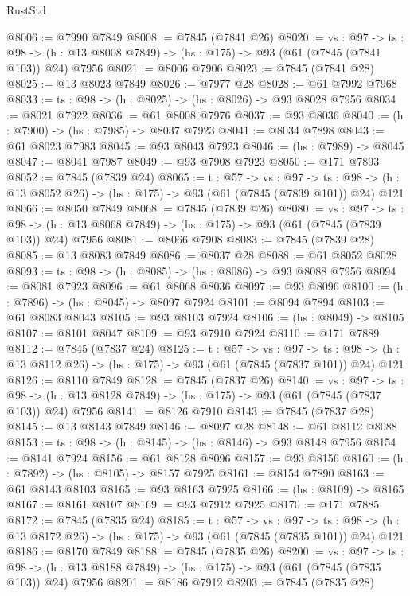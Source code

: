 \begin{lexlean}{RustStd}
\begin{coremodule}
@8006 := @7990 @7849
@8008 := @7845 (@7841 @26)
@8020 := {vs : @97} ->
  {ts : @98} -> (h : @13 @8008 @7849) -> (hs : @175) -> @93 (@61 (@7845 (@7841 @103)) @24) @7956
@8021 := @8006 @7906
@8023 := @7845 (@7841 @28)
@8025 := @13 @8023 @7849
@8026 := @7977 @28
@8028 := @61 @7992 @7968
@8033 := {ts : @98} -> (h : @8025) -> (hs : @8026) -> @93 @8028 @7956
@8034 := @8021 @7922
@8036 := @61 @8008 @7976
@8037 := @93 @8036
@8040 := (h : @7900) -> (hs : @7985) -> @8037 @7923
@8041 := @8034 @7898
@8043 := @61 @8023 @7983
@8045 := @93 @8043 @7923
@8046 := (hs : @7989) -> @8045
@8047 := @8041 @7987
@8049 := @93 @7908 @7923
@8050 := @171 @7893
@8052 := @7845 (@7839 @24)
@8065 := {t : @57} ->
  {vs : @97} ->
  {ts : @98} -> (h : @13 @8052 @26) -> (hs : @175) -> @93 (@61 (@7845 (@7839 @101)) @24) @121
@8066 := @8050 @7849
@8068 := @7845 (@7839 @26)
@8080 := {vs : @97} ->
  {ts : @98} -> (h : @13 @8068 @7849) -> (hs : @175) -> @93 (@61 (@7845 (@7839 @103)) @24) @7956
@8081 := @8066 @7908
@8083 := @7845 (@7839 @28)
@8085 := @13 @8083 @7849
@8086 := @8037 @28
@8088 := @61 @8052 @8028
@8093 := {ts : @98} -> (h : @8085) -> (hs : @8086) -> @93 @8088 @7956
@8094 := @8081 @7923
@8096 := @61 @8068 @8036
@8097 := @93 @8096
@8100 := (h : @7896) -> (hs : @8045) -> @8097 @7924
@8101 := @8094 @7894
@8103 := @61 @8083 @8043
@8105 := @93 @8103 @7924
@8106 := (hs : @8049) -> @8105
@8107 := @8101 @8047
@8109 := @93 @7910 @7924
@8110 := @171 @7889
@8112 := @7845 (@7837 @24)
@8125 := {t : @57} ->
  {vs : @97} ->
  {ts : @98} -> (h : @13 @8112 @26) -> (hs : @175) -> @93 (@61 (@7845 (@7837 @101)) @24) @121
@8126 := @8110 @7849
@8128 := @7845 (@7837 @26)
@8140 := {vs : @97} ->
  {ts : @98} -> (h : @13 @8128 @7849) -> (hs : @175) -> @93 (@61 (@7845 (@7837 @103)) @24) @7956
@8141 := @8126 @7910
@8143 := @7845 (@7837 @28)
@8145 := @13 @8143 @7849
@8146 := @8097 @28
@8148 := @61 @8112 @8088
@8153 := {ts : @98} -> (h : @8145) -> (hs : @8146) -> @93 @8148 @7956
@8154 := @8141 @7924
@8156 := @61 @8128 @8096
@8157 := @93 @8156
@8160 := (h : @7892) -> (hs : @8105) -> @8157 @7925
@8161 := @8154 @7890
@8163 := @61 @8143 @8103
@8165 := @93 @8163 @7925
@8166 := (hs : @8109) -> @8165
@8167 := @8161 @8107
@8169 := @93 @7912 @7925
@8170 := @171 @7885
@8172 := @7845 (@7835 @24)
@8185 := {t : @57} ->
  {vs : @97} ->
  {ts : @98} -> (h : @13 @8172 @26) -> (hs : @175) -> @93 (@61 (@7845 (@7835 @101)) @24) @121
@8186 := @8170 @7849
@8188 := @7845 (@7835 @26)
@8200 := {vs : @97} ->
  {ts : @98} -> (h : @13 @8188 @7849) -> (hs : @175) -> @93 (@61 (@7845 (@7835 @103)) @24) @7956
@8201 := @8186 @7912
@8203 := @7845 (@7835 @28)

\end{coremodule}
\end{lexlean}
